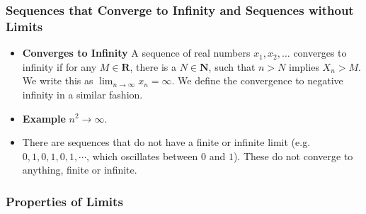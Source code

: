 \documentclass[handout]{beamer}
\begin{document}
\frame
{
  \frametitle{Sequences that Converge to Infinity and Sequences without Limits}

  \begin{itemize}
  \item <1->  \textbf{Converges to Infinity} A sequence of real numbers $x_1,x_2,\ldots$ converges to infinity if for any $M\in\mathbf{R}$, there is a $N\in\mathbf{N}$, such that $n>N$ implies $X_n>M$. We write this as $\lim_{n\rightarrow\infty} x_n=\infty$. We define the convergence to negative infinity in a similar fashion. 
  
      \item<2-> \textbf{Example} $n^2 \to \infty.$

    \item<3-> There are sequences that do not have a finite or infinite limit (e.g. $0,1,0,1,0,1,\cdots$, which oscillates between $0$ and $1$). These do not converge to anything, finite or infinite.
 
         
  \end{itemize}
}






\subsubsection{Properties of Limits}
\end{document}
